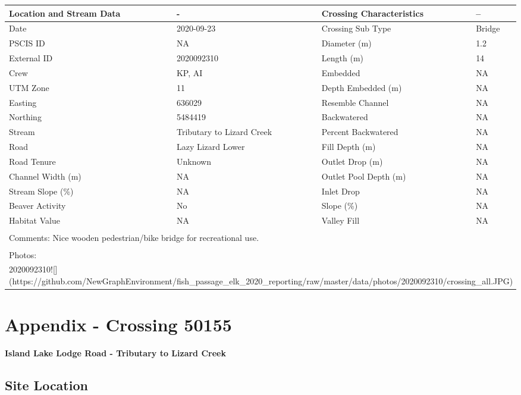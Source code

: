 \documentclass[
]{book}
\begin{document}
\begin{tabular}{l|l|l|l}
\hline
Location and Stream Data & - & Crossing Characteristics & --\\
\hline
Date & 2020-09-23 & Crossing Sub Type & Bridge\\
\hline
PSCIS ID & NA & Diameter (m) & 1.2\\
\hline
External ID & 2020092310 & Length (m) & 14\\
\hline
Crew & KP, AI & Embedded & NA\\
\hline
UTM Zone & 11 & Depth Embedded (m) & NA\\
\hline
Easting & 636029 & Resemble Channel & NA\\
\hline
Northing & 5484419 & Backwatered & NA\\
\hline
Stream & Tributary to Lizard Creek & Percent Backwatered & NA\\
\hline
Road & Lazy Lizard Lower & Fill Depth (m) & NA\\
\hline
Road Tenure & Unknown & Outlet Drop (m) & NA\\
\hline
Channel Width (m) & NA & Outlet Pool Depth (m) & NA\\
\hline
Stream Slope (\%) & NA & Inlet Drop & NA\\
\hline
Beaver Activity & No & Slope (\%) & NA\\
\hline
Habitat Value & NA & Valley Fill & NA\\
\hline
\multicolumn{4}{l}{\textsuperscript{} Comments: Nice wooden pedestrian/bike bridge for recreational use.}\\
\multicolumn{4}{l}{\textsuperscript{} Photos:}\\
\multicolumn{4}{l}{2020092310![](https://github.com/NewGraphEnvironment/fish\_passage\_elk\_2020\_reporting/raw/master/data/photos/2020092310/crossing\_all.JPG)}\\
\end{tabular}

\hypertarget{appendix---crossing-50155}{%
\chapter*{Appendix - Crossing 50155}\label{appendix---crossing-50155}}

\textbf{Island Lake Lodge Road - Tributary to Lizard Creek}

\hypertarget{site-location}{%
\section*{Site Location}\label{site-location}}
\end{document}
